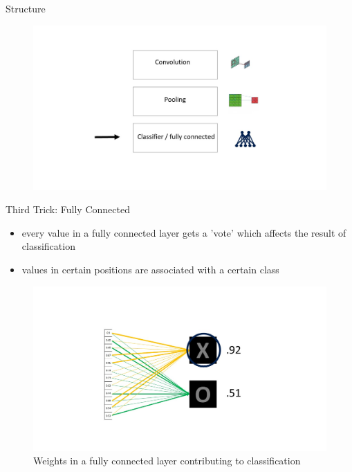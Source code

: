 \documentclass[12pt]{beamer}
\begin{document}
\begin{frame}{Structure}
\begin{figure}
\includegraphics[width = 1\linewidth]{images/struct3.jpg}
\label{fig:principle}
\end{figure}
\end{frame}

\begin{frame}{Third Trick: Fully Connected}
  \begin{itemize}
  \item every value in a fully connected layer gets a 'vote' which affects the result of classification
  \item values in certain positions are associated with a certain class
    \end{itemize}
\begin{figure}
\includegraphics[width = 0.8\linewidth]{images/fc.jpg}
\caption{Weights in a fully connected layer contributing to classification}
\label{fig:principle}
\end{figure}

\end{frame}
\end{document}
